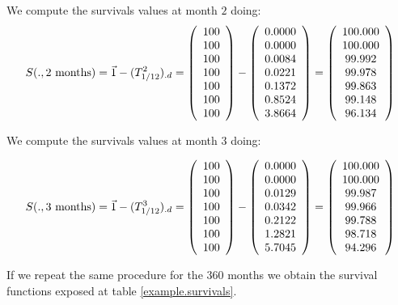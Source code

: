 \documentclass[a4paper,12pt,final]{article}
\begin{document}
We compute the survivals values at month $2$ doing:
\begin{displaymath}
S(.,2 \textrm{ months}) = \vec{1} - (T_{1/12}^2)_{.d} = 
\left( 
\begin{array}{c}
 100 \cr
 100 \cr
 100 \cr
 100 \cr
 100 \cr
 100 \cr
 100
\end{array}
\right)
 - 
\left( 
\begin{array}{c}
 0.0000 \cr
 0.0000 \cr
 0.0084 \cr
 0.0221 \cr
 0.1372 \cr
 0.8524 \cr
 3.8664
\end{array}
\right)
=
\left( 
\begin{array}{c}
 100.000 \cr
 100.000 \cr
  99.992 \cr
  99.978 \cr
  99.863 \cr
  99.148 \cr
  96.134 
\end{array}
\right)
\end{displaymath}

We compute the survivals values at month $3$ doing:

\begin{displaymath}
S(.,3 \textrm{ months}) = \vec{1} - (T_{1/12}^3)_{.d} = 
\left( 
\begin{array}{c}
 100 \cr
 100 \cr
 100 \cr
 100 \cr
 100 \cr
 100 \cr
 100
\end{array}
\right)
 - 
\left( 
\begin{array}{c}
 0.0000 \cr
 0.0000 \cr
 0.0129 \cr
 0.0342 \cr
 0.2122 \cr
 1.2821 \cr
 5.7045
\end{array}
\right)
=
\left( 
\begin{array}{c}
 100.000 \cr
 100.000 \cr
  99.987 \cr
  99.966 \cr
  99.788 \cr
  98.718 \cr
  94.296 
\end{array}
\right)
\end{displaymath}

If we repeat the same procedure for the $360$ months we obtain the survival
functions exposed at table \ref{example.survivals}.

\clearpage 
\end{document}
